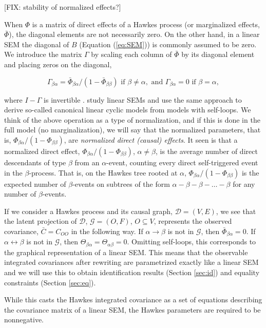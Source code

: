 \documentclass[accepted]{uai2021} %
\begin{document}
[FIX: stability of normalized effects?]

When $\Phi$ is a matrix of direct effects of a Hawkes process (or marginalized 
effects, $\bar{\Phi}$), the diagonal 
elements are not necessarily zero. On the other hand, in a linear SEM the 
diagonal of $B$ 
(Equation (\ref{eq:SEM})) is commonly assumed to be zero. We introduce 
the matrix $\Gamma$ by scaling each column of $\bar{\Phi}$ by its 
diagonal element and placing zeros on the diagonal,

$$
\Gamma_{\beta\alpha} = 
\bar{\Phi}_{\beta\alpha}/(1-\bar{\Phi}_{\beta\beta})  \text{ 
	if } \beta\neq \alpha, \text{ and } 
\Gamma_{\beta\alpha} 
= 0 \text{ if } \beta= \alpha,
$$

where $I-\Gamma$ is invertible \cite{hyttinen2012}. \cite{hyttinen2012} 
study linear SEMs and use the same approach to derive 
so-called canonical linear 
cyclic models from models with self-loops. We think of the above operation as a 
type of normalization, and if this is done in the full model (no 
marginalization), we 
will say that the normalized parameters, that is, 
${\Phi}_{\beta\alpha}/(1-{\Phi}_{\beta\beta}) $,
are \emph{normalized direct
	(causal) effects}. It seen is that a normalized direct effect, 
${\Phi}_{\beta\alpha}/(1-{\Phi}_{\beta\beta}) $, $\alpha\neq\beta$, is the 
average number of 
direct 
descendants of type 
$\beta$ from an $\alpha$-event, counting every direct self-triggered event in 
the $\beta$-process. 
That is, on the Hawkes tree rooted at $\alpha$, 
${\Phi}_{\beta\alpha}/(1-{\Phi}_{\beta\beta}) $ is 
the expected number of $\beta$-events on subtrees of the form $\alpha - \beta - 
\beta - \ldots - 
\beta$ for any number of $\beta$-events. 


If we consider a Hawkes process and its causal graph, $\mathcal{D} = (V,E)$, we 
see that the latent projection of $\mathcal{D}$, $\mathcal{G} = (O,F)$, 
$O\subseteq V$, represents the observed covariance, $\bar{C} = C_{OO}$ in the 
following way. If $\alpha\rightarrow\beta$ is not in $\mathcal{G}$, then 
$\bar{\Phi}_{\beta\alpha}=0$. If $\alpha\leftrightarrow\beta$ is not in 
$\mathcal{G}$, then $\Theta_{\beta\alpha} = \Theta_{\alpha\beta} = 0$. Omitting 
self-loops, this corresponds to the graphical representation of a linear SEM. 
This means that the observable integrated covariances after rewriting are 
parametrized exactly like a linear SEM and we will use this to obtain 
identification results (Section \ref{sec:id}) and equality constraints (Section 
\ref{sec:eq}).

While 
this 
casts the Hawkes integrated covariance as a set of equations describing the 
covariance 
matrix of a linear SEM, the Hawkes parameters are required to be nonnegative. 
\end{document}
